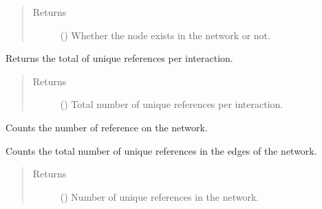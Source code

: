 \documentclass[letterpaper,10pt,english]{sphinxmanual}
\begin{document}
\begin{fulllineitems}
\begin{fulllineitems}
\begin{quote}
\begin{description}
\item[{Returns}] \leavevmode
() \textendash{} Whether the node exists in the network or not.

\end{description}\end{quote}

\end{fulllineitems}


\begin{fulllineitems}
\label{\detokenize{main:pypath.main.PyPath.numof_directed_edges}}
\end{fulllineitems}


\begin{fulllineitems}
\label{\detokenize{main:pypath.main.PyPath.numof_reference_interaction_pairs}}
Returns the total of unique references per interaction.
\begin{quote}\begin{description}
\item[{Returns}] \leavevmode
() \textendash{} Total number of unique references per
interaction.

\end{description}\end{quote}

\end{fulllineitems}


\begin{fulllineitems}
\label{\detokenize{main:pypath.main.PyPath.numof_references}}
Counts the number of reference on the network.

Counts the total number of unique references in the edges of the
network.
\begin{quote}\begin{description}
\item[{Returns}] \leavevmode
() \textendash{} Number of unique references in the network.


\end{description}
\end{quote}
\end{fulllineitems}
\end{fulllineitems}
\end{document}
